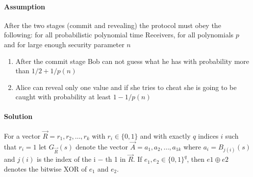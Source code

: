 \documentclass{article}
\begin{document}
\paragraph{Assumption}\label{sec-assumption}%

\noindent{}After the two stages (commit and revealing) the protocol must obey the
following: for all probabilistic polynomial time Receivers, for all polynomials
$p$ and for large enough security parameter $n$%

\begin{enumerate}[noitemsep,topsep=\mdcompacttopsep]%

\item{}After the commit stage Bob can not guess what he has with probability
more than $1/2 + 1/p(n)$%

\item{}Alice can reveal only one value and if she tries to cheat she is going to
be caught with probability at least $1 - 1/p(n)$%
\end{enumerate}%

\paragraph{Solution}\label{sec-solution}%

\noindent{}For a vector $\vec{R} = r_1, r_2, \dots, r_k$ with $r_i \in \{0, 1\}$ and with exactly $q$ indices
$i$ such that $r_i = 1$ let $G_{\vec{R}}(s)$ denote the vector $\vec{A} = a_1, a_2, \dots, a_{1k}$ where $a_i = B_{j(i)}(s)$ and $j(i)$ is the index of the i − th 1 in $\vec{R}$. If $e_1, e_2 \in \{0, 1\}^q$, then $e1 \oplus e2$ denotes the bitwise XOR of $e_1$ and $e_2$.%
\end{document}
